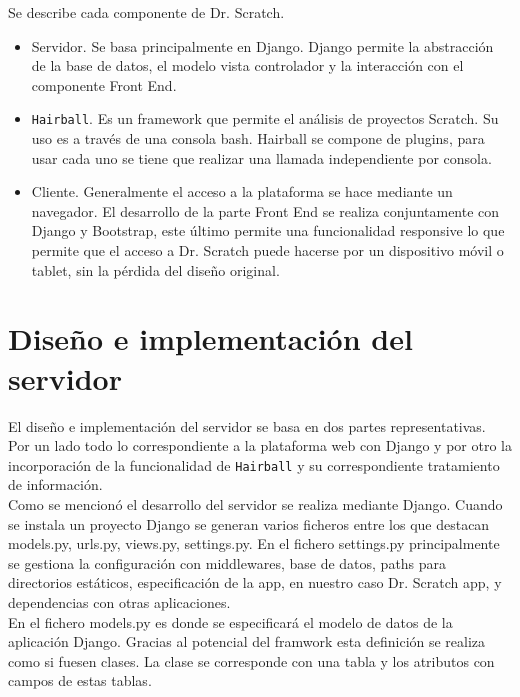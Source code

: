 \documentclass[a4paper, 12pt]{book}
\begin{document}
Se describe cada componente de Dr. Scratch.

\begin{itemize}
  \item Servidor. Se basa principalmente en Django. Django permite la abstracción de la
	base de datos, el modelo vista controlador y la interacción con el componente Front End.
  \item \texttt{Hairball}. Es un framework que permite el análisis de proyectos Scratch. Su uso es
	a través de una consola bash. Hairball se compone de plugins, para usar cada uno se
	tiene que realizar una llamada independiente por consola.
  \item Cliente. Generalmente el acceso a la plataforma se hace mediante un navegador. El
	desarrollo de la parte Front End se realiza conjuntamente con Django y Bootstrap, este
	último permite una funcionalidad responsive lo que permite que el acceso a Dr. Scratch
	puede hacerse por un dispositivo móvil o tablet, sin la pérdida del diseño original. 
\end{itemize}



\section{Diseño e implementación del servidor}
\label{sec:servidor}

El diseño e implementación del servidor se basa en dos partes representativas. Por un lado todo lo
correspondiente a la plataforma web con Django y por otro la incorporación de la funcionalidad de
\texttt{Hairball} y su correspondiente tratamiento de información. \\

Como se mencionó el desarrollo del servidor se realiza mediante Django. Cuando se instala un proyecto
Django se generan varios ficheros entre los que destacan models.py, urls.py, views.py, settings.py.
En el fichero settings.py principalmente se gestiona la configuración con middlewares, base de datos,
paths para directorios estáticos, especificación de la app, en nuestro caso Dr. Scratch app, y 
dependencias con otras aplicaciones. \\

En el fichero models.py es donde se especificará el modelo de datos de la aplicación Django. Gracias 
al potencial del framwork esta definición se realiza como si fuesen clases. La clase se corresponde 
con una tabla y los atributos con campos de estas tablas. \\
\end{document}
